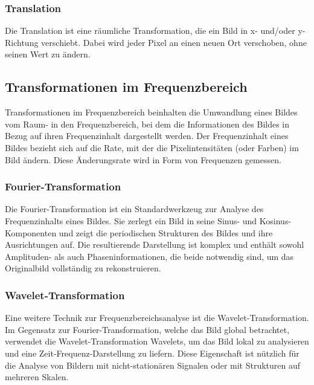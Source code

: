 \subsubsection{Translation}
Die Translation ist eine räumliche Transformation, die ein Bild in x- und/oder y-Richtung verschiebt. 
Dabei wird jeder Pixel an einen neuen Ort verschoben, ohne seinen Wert zu ändern.

\subsection{Transformationen im Frequenzbereich}
Transformationen im Frequenzbereich beinhalten die Umwandlung eines Bildes vom Raum- in den Frequenzbereich, 
bei dem die Informationen des Bildes in Bezug auf ihren Frequenzinhalt dargestellt werden.
Der Frequenzinhalt eines Bildes bezieht sich auf die Rate, mit der die Pixelintensitäten (oder Farben) im Bild ändern. 
Diese Änderungsrate wird in Form von Frequenzen gemessen.

\subsubsection{Fourier-Transformation}
Die Fourier-Transformation ist ein Standardwerkzeug zur Analyse des Frequenzinhalts eines Bildes. 
Sie zerlegt ein Bild in seine Sinus- und Kosinus-Komponenten und zeigt die periodischen Strukturen des Bildes und ihre Ausrichtungen auf. 
Die resultierende Darstellung ist komplex und enthält sowohl Amplituden- als auch Phaseninformationen, die beide notwendig sind, 
um das Originalbild vollständig zu rekonstruieren.~\cite{S._Sridhar_2014_mecs-press}

\subsubsection{Wavelet-Transformation}
Eine weitere Technik zur Frequenzbereichsanalyse ist die Wavelet-Transformation. Im Gegensatz zur Fourier-Transformation, 
welche das Bild global betrachtet, verwendet die Wavelet-Transformation Wavelets, um das Bild lokal zu analysieren 
und eine Zeit-Frequenz-Darstellung zu liefern. Diese Eigenschaft ist nützlich für die Analyse von Bildern mit 
nicht-stationären Signalen oder mit Strukturen auf mehreren Skalen.~\cite{S._Sridhar_2014_mecs-press}

